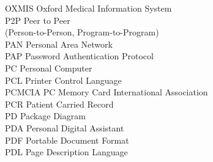 \begin{tabbing}
    \>OXMIS \>\>Oxford Medical Information System\\


    \>P2P \>\>Peer to Peer\\
        \>\>\>(Person-to-Person, Program-to-Program)\\




    \>PAN \>\>Personal Area Network\\

    \>PAP \>\>Password Authentication Protocol\\


    \>PC \>\>Personal Computer\\

    \>PCL \>\>Printer Control Language\\

    \>PCMCIA \>\>PC Memory Card International Association\\

    \>PCR \>\>Patient Carried Record\\


    \>PD \>\>Package Diagram\\

    \>PDA \>\>Personal Digital Assistant\\

    \>PDF \>\>Portable Document Format\\

    \>PDL \>\>Page Description Language\\





\end{tabbing}

